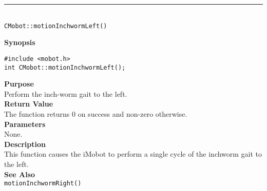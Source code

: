\noindent
\vspace{5pt}
\rule{4.5in}{0.015in}\\
\noindent
{\LARGE \texttt{CMobot::motionInchwormLeft()}}\\
{}

\noindent
{\bf Synopsis}\\
\begin{verbatim}
#include <mobot.h>
int CMobot::motionInchwormLeft();
\end{verbatim}

\noindent
{\bf Purpose}\\
Perform the inch-worm gait to the left.\\

\noindent
{\bf Return Value}\\
The function returns 0 on success and non-zero otherwise.\\

\noindent
{\bf Parameters}\\
None.\\

\noindent
{\bf Description}\\
This function causes the iMobot to perform a single cycle of the inchworm gait
to the left.\\

\noindent
{\bf See Also}\\
\texttt{motionInchwormRight()}

